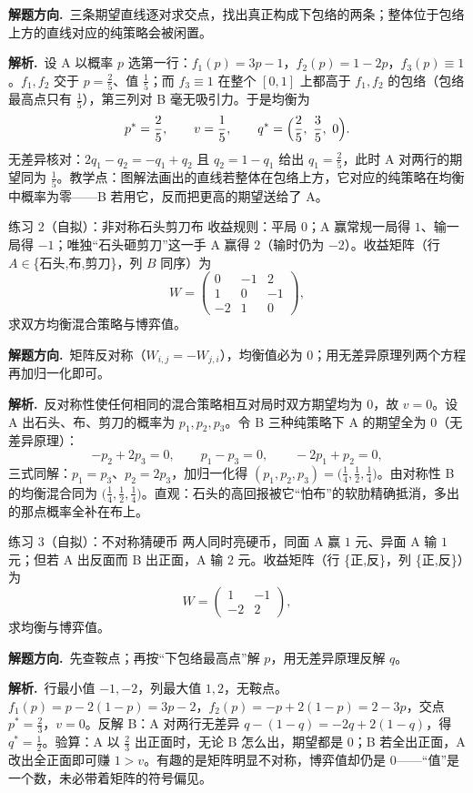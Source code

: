 \documentclass[UTF8,a4paper,11pt,oneside,openany,fontset=fandol]{ctexbook}
\theoremstyle{definition}
\newcommand{\sol}{\par\noindent\textbf{解析.}\ }
\newcommand{\hint}{\par\noindent\textbf{解题方向.}\ }
\begin{document}
\hint 三条期望直线逐对求交点，找出真正构成下包络的两条；整体位于包络上方的直线对应的纯策略会被闲置。

\sol 设 A 以概率 $p$ 选第一行：$f_1(p)=3p-1$，$f_2(p)=1-2p$，$f_3(p)\equiv1$。$f_1,f_2$ 交于 $p=\tfrac25$、值 $\tfrac15$；而 $f_3\equiv1$ 在整个 $[0,1]$ 上都高于 $f_1,f_2$ 的包络（包络最高点只有 $\tfrac15$），第三列对 B 毫无吸引力。于是均衡为
\[
 p^{*}=\frac25,\qquad v=\frac15,\qquad q^{*}=\Bigl(\frac25,\ \frac35,\ 0\Bigr).
\]
无差异核对：$2q_1-q_2=-q_1+q_2$ 且 $q_2=1-q_1$ 给出 $q_1=\tfrac25$，此时 A 对两行的期望同为 $\tfrac15$。教学点：图解法画出的直线若整体在包络上方，它对应的纯策略在均衡中概率为零——B 若用它，反而把更高的期望送给了 A。

\begin{problem}{练习 2（自拟）：非对称石头剪刀布}
收益规则：平局 $0$；A 赢常规一局得 $1$、输一局得 $-1$；唯独“石头砸剪刀”这一手 A 赢得 $2$（输时仍为 $-2$）。收益矩阵（行 $A\in$\{石头,布,剪刀\}，列 $B$ 同序）为
\[
 W=\begin{pmatrix}0&-1&2\\1&0&-1\\-2&1&0\end{pmatrix},
\]
求双方均衡混合策略与博弈值。
\end{problem}

\hint 矩阵反对称（$W_{i,j}=-W_{j,i}$），均衡值必为 $0$；用无差异原理列两个方程再加归一化即可。

\sol 反对称性使任何相同的混合策略相互对局时双方期望均为 $0$，故 $v=0$。设 A 出石头、布、剪刀的概率为 $p_1,p_2,p_3$。令 B 三种纯策略下 A 的期望全为 $0$（无差异原理）：
\[
 -p_2+2p_3=0,\qquad p_1-p_3=0,\qquad -2p_1+p_2=0,
\]
三式同解：$p_1=p_3$、$p_2=2p_3$，加归一化得 $(p_1,p_2,p_3)=\bigl(\tfrac14,\tfrac12,\tfrac14\bigr)$。由对称性 B 的均衡混合同为 $\bigl(\tfrac14,\tfrac12,\tfrac14\bigr)$。直观：石头的高回报被它“怕布”的软肋精确抵消，多出的那点概率全补在布上。

\begin{problem}{练习 3（自拟）：不对称猜硬币}
两人同时亮硬币，同面 A 赢 $1$ 元、异面 A 输 $1$ 元；但若 A 出反面而 B 出正面，A 输 $2$ 元。收益矩阵（行 \{正,反\}，列 \{正,反\}）为
\[
 W=\begin{pmatrix}1&-1\\-2&2\end{pmatrix},
\]
求均衡与博弈值。
\end{problem}

\hint 先查鞍点；再按“下包络最高点”解 $p$，用无差异原理反解 $q$。

\sol 行最小值 $-1,-2$，列最大值 $1,2$，无鞍点。$f_1(p)=p-2(1-p)=3p-2$，$f_2(p)=-p+2(1-p)=2-3p$，交点 $p^{*}=\tfrac23$，$v=0$。反解 B：A 对两行无差异 $q-(1-q)=-2q+2(1-q)$，得 $q^{*}=\tfrac12$。验算：A 以 $\tfrac23$ 出正面时，无论 B 怎么出，期望都是 $0$；B 若全出正面，A 改出全正面即可赚 $1>v$。有趣的是矩阵明显不对称，博弈值却仍是 $0$——“值”是一个数，未必带着矩阵的符号偏见。
\end{document}
